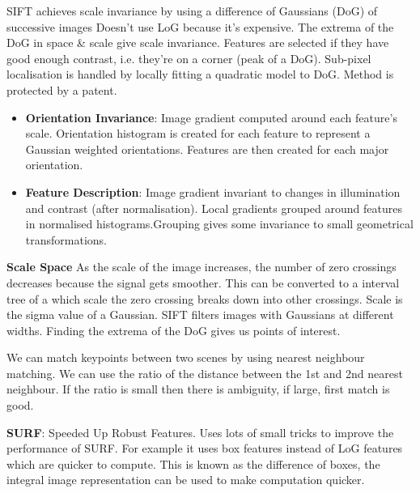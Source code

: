 \documentclass[8pt]{extarticle}
\begin{document}
\begin{multicols}{2}
SIFT achieves scale invariance by using a difference of Gaussians (DoG) of successive images Doesn't use LoG because it's expensive. The extrema of the DoG in space \& scale give scale invariance. Features are selected if they have good enough contrast, i.e. they're on a corner (peak of a DoG). Sub-pixel localisation is handled by locally fitting a quadratic model to DoG. Method is protected by a patent.
\begin{itemize}
    \item \textbf{Orientation Invariance}: Image gradient computed around each feature's scale. Orientation histogram is created for each feature to represent a Gaussian weighted orientations. Features are then created for each major orientation.
    \item \textbf{Feature Description}: Image gradient invariant to changes in illumination and contrast (after normalisation). Local gradients grouped around features in normalised histograms.Grouping gives some invariance to small geometrical transformations.
\end{itemize}

\textbf{Scale Space} As the scale of the image increases, the number of zero crossings decreases because the signal gets smoother. This can be converted to a interval tree of a which scale the zero crossing breaks down into other crossings. Scale is the sigma value of a Gaussian. SIFT filters images with Gaussians at different widths. Finding the extrema of the DoG gives us points of interest.

We can match keypoints between two scenes by using nearest neighbour matching. We can use the ratio of the distance between the 1st and 2nd nearest neighbour. If the ratio is small then there is ambiguity, if large, first match is good.

\textbf{SURF}: Speeded Up Robust Features. Uses lots of small tricks to improve the performance of SURF. For example it uses box features instead of LoG features which are quicker to compute. This is known as the difference of boxes, the integral image representation can be used to make computation quicker.


\end{multicols}
\end{document}
